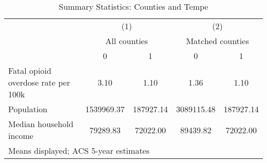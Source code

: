 \begin{table}[htbp]\centering
\def\sym#1{\ifmmode^{#1}\else\(^{#1}\)\fi}
\caption{\centering Summary Statistics: Counties and Tempe}
\begin{tabular}{l*{4}{c}}
\toprule
                    &\multicolumn{2}{c}{(1)}  &\multicolumn{2}{c}{(2)}  \\
                    &\multicolumn{2}{c}{All counties}&\multicolumn{2}{c}{Matched counties}\\
                    &           0&           1&           0&           1\\
\midrule
Fatal opioid overdose rate per 100k&        3.10&        1.10&        1.36&        1.10\\
Population          &  1539969.37&   187927.14&  3089115.48&   187927.14\\
Median household income&    79289.83&    72022.00&    89439.82&    72022.00\\
\bottomrule
\multicolumn{5}{l}{\footnotesize Means displayed; ACS 5-year estimates}\\
\end{tabular}
\end{table}
